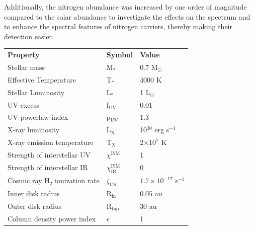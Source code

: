 \documentclass[oneside, single, authoryear, semicolon, 12pt]{lion-msc}
\newcommand{\4}{$_4$}
\newcommand{\3}{$_3$}
\newcommand{\2}{$_2$}
\begin{document}
Additionally, the nitrogen abundance was increased by one order of magnitude compared to the solar abundance to investigate the effects on the spectrum and to enhance the spectral features of nitrogen carriers, thereby making their detection easier.

\begin{table}[H]
\centering
\begin{tabular}{@{}lll@{}}
                                  &                             &                            \\ \hline\midrule
\textbf{Property}                 & \textbf{Symbol}             & \textbf{Value}             \\ \midrule
Stellar mass                      & M$_\ast$                    & 0.7 M$_\odot$               \\
Effective Temperature             & T$_\ast$                    & 4000 K                     \\
Stellar Luminosity                & L$_\ast$                    & 1 L$_\odot$                \\
UV excess                         & f$_{\mathrm{UV}}$                    & 0.01                       \\
UV powerlaw index                 & p$_{\mathrm{UV}}$                    & 1.3                        \\
X-ray luminosity                  & L$_\mathrm{X}$                       & 10$^{30}$ erg s$^{-1}$              \\
X-ray emission temperature        & T$_\mathrm{X}$                       & 2$\times10^7$ K            \\ \midrule
Strength of interstellar UV       & $\chi^{\mathrm{ISM}}$                & 1                          \\
Strength of interstellar IR       & $\chi^{\mathrm{ISM}}_{\mathrm{IR}}$           & 0                          \\
Cosmic ray H$_2$ ionization rate  & $\zeta_{\mathrm{CR}}$                & $1.7\times10^{-17}$ s$ ^{-1}$ \\ \midrule
Inner disk radius                 & R$_{\mathrm{in}}$                    & 0.05 au                    \\
Outer disk radius                 & R$_{\mathrm{tap}}$                   & 30 au                      \\
Column density power index        & $\epsilon$                  & 1                          \\

\end{tabular}
\end{table}
\end{document}

